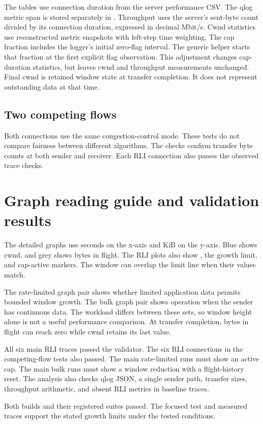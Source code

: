 \documentclass[11pt,a4paper]{article}
\newcommand{\code}[1]{\texttt{\detokenize{#1}}}
\begin{document}
The tables use connection duration from the server performance CSV.
The qlog metric span is stored separately in .
Throughput uses the server's sent-byte count divided by its connection duration, expressed in decimal Mbit/s.
Cwnd statistics use reconstructed metric snapshots with left-step time weighting.
The cap fraction includes the logger's initial zero-flag interval.
The generic helper starts that fraction at the first explicit flag observation.
This adjustment changes cap-duration statistics, but leaves cwnd and throughput measurements unchanged.
Final cwnd is retained window state at transfer completion.
It does not represent outstanding data at that time.

\subsection{Two competing flows}

Both connections use the same congestion-control mode.
These tests do not compare fairness between different algorithms.
The checks confirm transfer byte counts at both sender and receiver.
Each RLI connection also passes the observed trace checks.

\section{Graph reading guide and validation results}
The detailed graphs use seconds on the x-axis and KiB on the y-axis.
Blue shows cwnd, and grey shows bytes in flight.
The RLI plots also show \code{maxFS}, the growth limit, and cap-active markers.
The window can overlap the limit line when their values match.

The rate-limited graph pair shows whether limited application data permits bounded window growth.
The bulk graph pair shows operation when the sender has continuous data.
The workload differs between these sets, so window height alone is not a useful performance comparison.
At transfer completion, bytes in flight can reach zero while cwnd retains its last value.

All six main RLI traces passed the validator.
The six RLI connections in the competing-flow tests also passed.
The main rate-limited runs must show an active cap.
The main bulk runs must show a window reduction with a flight-history reset.
The analysis also checks qlog JSON, a single sender path, transfer sizes, throughput arithmetic, and absent RLI metrics in baseline traces.

Both builds and their registered suites passed.
The focused test and measured traces support the stated growth limits under the tested conditions.
\end{document}
